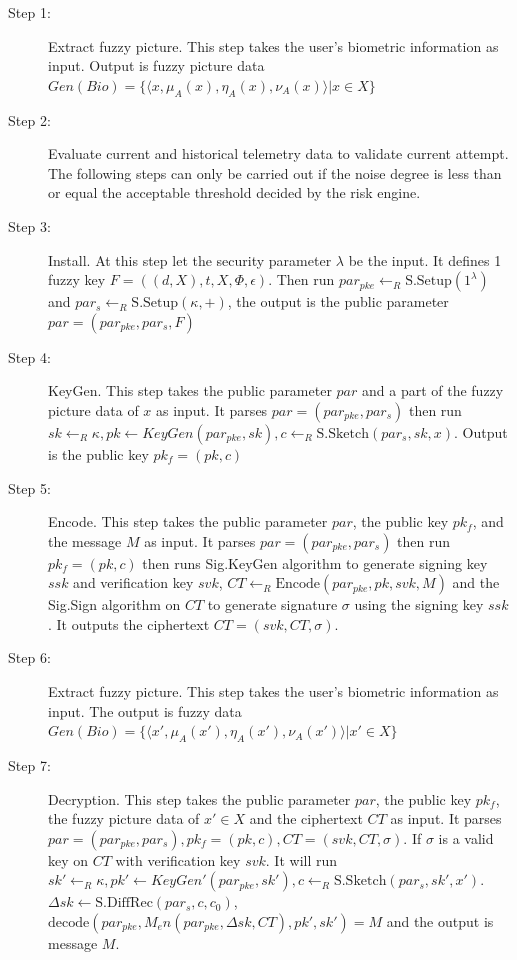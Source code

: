\documentclass[pdflatex,sn-mathphys-num]{sn-jnl}
\theoremstyle{thmstyleone}%
\theoremstyle{thmstyletwo}%
\theoremstyle{thmstylethree}%
\begin{document}
\begin{description}
	\item[Step 1:] Extract fuzzy picture. This step takes the user's biometric information as input. Output is fuzzy picture data $Gen(Bio) = \{ \langle x, \mu_A(x), \eta_A(x), \nu_A(x) \rangle | x \in X \}$
	
	\item[Step 2:] Evaluate current and historical telemetry data to validate current attempt. The following steps can only be carried out if the noise degree is less than or equal the acceptable threshold decided by the risk engine.
	
	\item[Step 3:] Install. At this step let the security parameter $\lambda$ be the input. It defines 1 fuzzy key $F = ((d, X), t, X, \Phi, \epsilon)$. Then run $par_{pke} \leftarrow_R \text{S.Setup}(1^\lambda)$ and $par_s \leftarrow_R \text{S.Setup}(\kappa, +)$, the output is the public parameter $par = (par_{pke}, par_s, F)$
	
	\item[Step 4:] KeyGen. This step takes the public parameter $par$ and a part of the fuzzy picture data of $x$ as input. It parses $par = (par_{pke}, par_s)$ then run $sk \leftarrow_R \kappa, pk \leftarrow KeyGen(par_{pke}, sk), c \leftarrow_R \text{S.Sketch}(par_s, sk, x)$. Output is the public key $pk_f = (pk, c)$
	
	\item[Step 5:] Encode. This step takes the public parameter $par$, the public key $pk_f$, and the message $M$ as input. It parses $par = (par_{pke}, par_s)$ then run $pk_f = (pk, c)$ then runs Sig.KeyGen algorithm to generate signing key $ssk$ and verification key $svk$, $CT \leftarrow_R \text{Encode}(par_{pke}, pk, svk, M)$ and the Sig.Sign algorithm on $CT$ to generate signature $\sigma$ using the signing key $ssk$. It outputs the ciphertext $CT = (svk, CT, \sigma)$.
	
	\item[Step 6:] Extract fuzzy picture. This step takes the user's biometric information as input. The output is fuzzy data $Gen(Bio) = \{ \langle x', \mu_A(x'), \eta_A(x'), \nu_A(x') \rangle | x' \in X \}$
	
	\item[Step 7:] Decryption. This step takes the public parameter $par$, the public key $pk_f$, the fuzzy picture data of $x' \in X$ and the ciphertext $CT$ as input. It parses $par = (par_{pke}, par_s), pk_f = (pk, c), CT = (svk, CT, \sigma)$. If $\sigma$ is a valid key on $CT$ with verification key $svk$. It will run $sk' \leftarrow_R \kappa, pk' \leftarrow KeyGen'(par_{pke}, sk'), c \leftarrow_R \text{S.Sketch}(par_s, sk', x')$. $\Delta sk \leftarrow \text{S.DiffRec}(par_s, c, c_0)$, $\text{decode}(par_{pke}, M_en(par_{pke}, \Delta sk, CT), pk', sk') = M$ and the output is message $M$.
\end{description}
\end{document}
